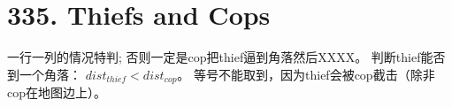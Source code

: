 \section{335. Thiefs and Cops}
一行一列的情况特判;
否则一定是cop把thief逼到角落然后XXXX。
判断thief能否到一个角落：
$dist_{thief} < dist_{cop}$。
等号不能取到，因为thief会被cop截击（除非cop在地图边上）。
